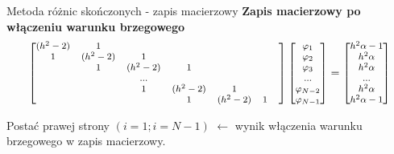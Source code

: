 	\begin{frame}{Metoda różnic skończonych - zapis macierzowy}
		\textbf{Zapis macierzowy po włączeniu warunku brzegowego}
		$$
		\footnotesize
		\begin{bmatrix}
		(h^2 -2) & 1 &  &  &  &  & \\ 
		 1&  (h^2 -2)& 1 &  &  &  & \\ 
		 & 1 &  (h^2 -2)& 1 &  &  & \\ 
		 &  &  ...& &  &  & \\ 
		  &  & 1 & (h^2 -2) &  1& & \\ 
		  &  &  & 1 &  (h^2 -2)& 1 &
		\end{bmatrix}		
		\begin{bmatrix}
		 \varphi_1 \\
		 \varphi_2 \\
		 \varphi_3 \\
		 ...\\
		 \varphi_{N-2}\\
		 \varphi_{N-1}\\
		\end{bmatrix}		
		= 		
		\begin{bmatrix} 
		 h^2\alpha -1 \\
		 h^2\alpha\\
		 h^2\alpha\\
		 ... \\
		 h^2\alpha\\
		 h^2\alpha - 1\\
		\end{bmatrix}
		$$

		
		Postać prawej strony $(i = 1; i = N-1)$ $\leftarrow$ wynik włączenia warunku brzegowego w zapis macierzowy.
		
	\end{frame}





